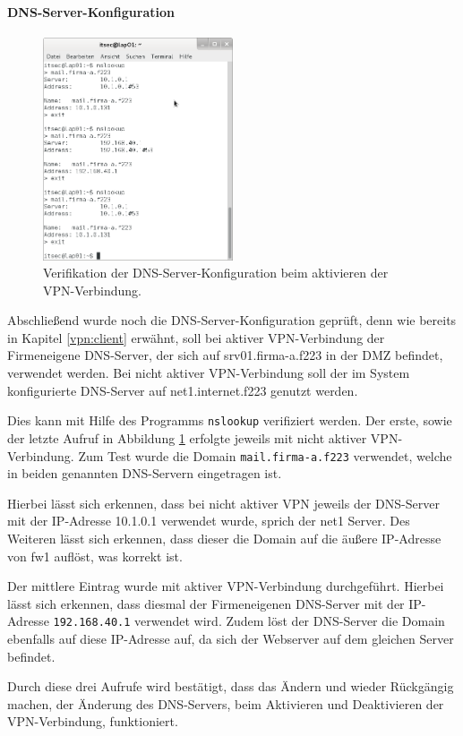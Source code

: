 \paragraph{DNS-Server-Konfiguration}

\begin{figure}[h!]
  \centering
    \includegraphics[width=0.5\textwidth]{figures/vpn_nslookup.png}
  \caption{Verifikation der DNS-Server-Konfiguration beim aktivieren der VPN-Verbindung.}
  \label{vpn:lap01_nslookup}
\end{figure}

Abschließend wurde noch die DNS-Server-Konfiguration geprüft, denn wie bereits in Kapitel \ref{vpn:client} erwähnt, soll bei aktiver VPN-Verbindung der Firmeneigene DNS-Server, der sich auf srv01.firma-a.f223 in der DMZ befindet, verwendet werden. Bei nicht aktiver VPN-Verbindung soll der im System konfigurierte DNS-Server auf net1.internet.f223 genutzt werden.

Dies kann mit Hilfe des Programms \texttt{nslookup} verifiziert werden. Der erste, sowie der letzte Aufruf in Abbildung \ref{vpn:lap01_nslookup} erfolgte jeweils mit nicht aktiver VPN-Verbindung. Zum Test wurde die Domain \texttt{mail.firma-a.f223} verwendet, welche in beiden genannten DNS-Servern eingetragen ist.

Hierbei lässt sich erkennen, dass bei nicht aktiver VPN jeweils der DNS-Server mit der IP-Adresse 10.1.0.1 verwendet wurde, sprich der net1 Server. Des Weiteren lässt sich erkennen, dass dieser die Domain auf die äußere IP-Adresse von fw1 auflöst, was korrekt ist.

Der mittlere Eintrag wurde mit aktiver VPN-Verbindung durchgeführt. Hierbei lässt sich erkennen, dass diesmal der Firmeneigenen DNS-Server mit der IP-Adresse \texttt{192.168.40.1} verwendet wird. Zudem löst der DNS-Server die Domain ebenfalls auf diese IP-Adresse auf, da sich der Webserver auf dem gleichen Server befindet.

Durch diese drei Aufrufe wird bestätigt, dass das Ändern und wieder Rückgängig machen, der Änderung des DNS-Servers, beim Aktivieren und Deaktivieren der VPN-Verbindung, funktioniert.
